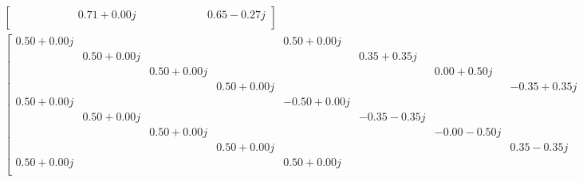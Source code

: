 \begin{gather*}
\begin{bmatrix}
            &            &            &            &            &            &            & 0.71+0.00j &            &            &            &            &            &            &            & 0.65-0.27j \\
\end{bmatrix}\\
\begin{bmatrix}
 0.50+0.00j &            &            &            & 0.50+0.00j &            &            &            & 0.50+0.00j &            &            &            & 0.50+0.00j &            &            &            \\
            & 0.50+0.00j &            &            &            & 0.35+0.35j &            &            &            & 0.46+0.19j &            &            &            & 0.19+0.46j &            &            \\
            &            & 0.50+0.00j &            &            &            & 0.00+0.50j &            &            &            & 0.35+0.35j &            &            &            &-0.35+0.35j &            \\
            &            &            & 0.50+0.00j &            &            &            &-0.35+0.35j &            &            &            & 0.19+0.46j &            &            &            &-0.46-0.19j \\
 0.50+0.00j &            &            &            &-0.50+0.00j &            &            &            & 0.00+0.50j &            &            &            &-0.00-0.50j &            &            &            \\
            & 0.50+0.00j &            &            &            &-0.35-0.35j &            &            &            &-0.19+0.46j &            &            &            & 0.46-0.19j &            &            \\
            &            & 0.50+0.00j &            &            &            &-0.00-0.50j &            &            &            &-0.35+0.35j &            &            &            & 0.35+0.35j &            \\
            &            &            & 0.50+0.00j &            &            &            & 0.35-0.35j &            &            &            &-0.46+0.19j &            &            &            &-0.19+0.46j \\
 0.50+0.00j &            &            &            & 0.50+0.00j &            &            &            &-0.50+0.00j &            &            &            &-0.50+0.00j &            &            &            \\

\end{bmatrix}
\end{gather*}
